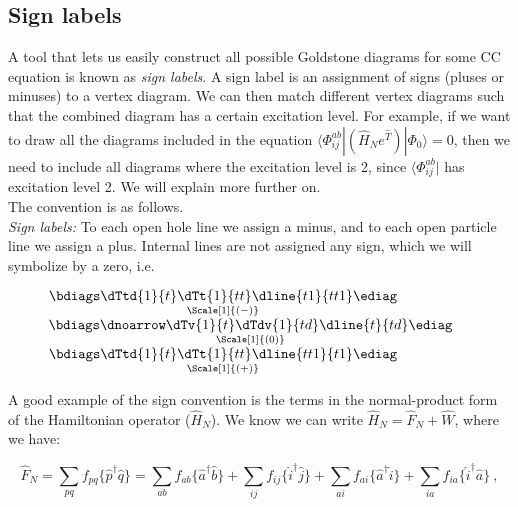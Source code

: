 	
	\subsection{Sign labels}
	A tool that lets us easily construct all possible Goldstone diagrams for some CC equation is known as \emph{sign labels}. A sign label is an assignment of signs (pluses or minuses) to a vertex diagram. We can then match different vertex diagrams such that the combined diagram has a certain excitation level. For example, if we want to draw all the diagrams included in the equation $\langle\Phi_{ij}^{ab}|\left(\hat{H}_Ne^{\hat
		T}\right)|\Phi_0\rangle = 0$, then we need to include all diagrams where the excitation level is 2, since $\langle\Phi_{ij}^{ab}|$ has excitation level 2. We will explain more further on.\\
	The convention is as follows.\\
	
	\emph{Sign labels:} To each open hole line we assign a minus, and to each open particle line we assign a plus. Internal lines are not assigned any sign, which we will symbolize by a zero, i.e.\\
	
	\begin{figure}[h]
		\centering
		$
		\underset{\Scale[1]{(-)}\hspace{0.005cm}}{\bdiags
		\dTtd{1}{t}
		\dTt{1}{tt}
		\dline{t1}{tt1}
		\ediag}
		$
		\hspace{2cm}
		$
		\underset{\Scale[1]{(0)}\hspace{0.005cm}}{\bdiags
			\dnoarrow
			\dTv{1}{t}
			\dTdv{1}{td}
			\dline{t}{td}
			\ediag}
		$
		\hspace{2cm}
		$
		\underset{\Scale[1]{(+)}\hspace{0.005cm}}{\bdiags
			\dTtd{1}{t}
			\dTt{1}{tt}
			\dline{tt1}{t1}
			\ediag}
			$
	\end{figure}
	
	A good example of the sign convention is the terms in the normal-product form of the Hamiltonian operator ($\hat{H}_N$). We know we can write $\hat{H}_N = \hat{F}_N + \hat{W}$, where we have:
	
	\begin{equation}
		\hat{F}_N = \sum_{pq} f_{pq}\{\hat{p}^\dagger \hat{q}\} = \sum_{ab} f_{ab}\{\hat{a}^\dagger \hat{b}\} + \sum_{ij} f_{ij}\{\hat{i}^\dagger \hat{j}\} + \sum_{ai} f_{ai}\{\hat{a}^\dagger \hat{i}\} + \sum_{ia} f_{ia}\{\hat{i}^\dagger \hat{a}\} \:,
	\end{equation}
	

